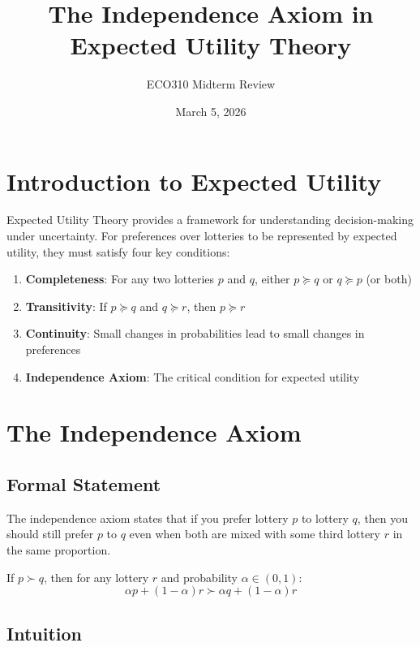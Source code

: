 \documentclass[12pt]{article}
\title{The Independence Axiom in Expected Utility Theory}
\author{ECO310 Midterm Review}
\date{March 5, 2026}
\begin{document}
\maketitle

\section{Introduction to Expected Utility}

Expected Utility Theory provides a framework for understanding decision-making under uncertainty. For preferences over lotteries to be represented by expected utility, they must satisfy four key conditions:

\begin{enumerate}
    \item \textbf{Completeness}: For any two lotteries $p$ and $q$, either $p \succeq q$ or $q \succeq p$ (or both)
    \item \textbf{Transitivity}: If $p \succeq q$ and $q \succeq r$, then $p \succeq r$
    \item \textbf{Continuity}: Small changes in probabilities lead to small changes in preferences
    \item \textbf{Independence Axiom}: The critical condition for expected utility
\end{enumerate}

\section{The Independence Axiom}

\subsection{Formal Statement}

The independence axiom states that if you prefer lottery $p$ to lottery $q$, then you should still prefer $p$ to $q$ even when both are mixed with some third lottery $r$ in the same proportion.

\begin{tcolorbox}[colback=blue!5!white,colframe=blue!75!black,title=Independence Axiom]
If $p \succ q$, then for any lottery $r$ and probability $\alpha \in (0,1)$:
$$\alpha p + (1-\alpha)r \succ \alpha q + (1-\alpha)r$$
\end{tcolorbox}

\subsection{Intuition}
\end{document}
